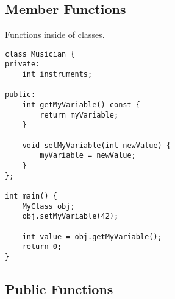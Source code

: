 \documentclass[openany]{report}
\begin{document}
\subsection{Member Functions}

Functions inside of classes.

\begin{verbatim}
class Musician {
private:
    int instruments;

public:
    int getMyVariable() const {
        return myVariable;
    }

    void setMyVariable(int newValue) {
        myVariable = newValue;
    }
};

int main() {
    MyClass obj;
    obj.setMyVariable(42);

    int value = obj.getMyVariable();
    return 0;
}
\end{verbatim}

\subsection{Public Functions}
\end{document}
